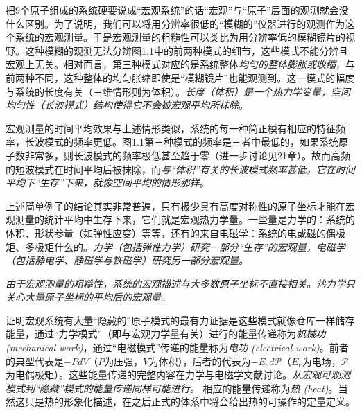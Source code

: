 把9个原子组成的系统硬要说成“宏观系统”的话“宏观”与“原子”层面的观测就会没什么区别。为了说明，我们可以将用分辨率很低的“模糊的”仪器进行的观测作为这个系统的宏观测量。于是宏观测量的粗糙性可以类比为用分辨率低的模糊镜片的视野。这种模糊的观测无法分辨图1.1中的前两种模式的细节，这些模式不能分辨且宏观上无关。相对而言，第三种模式对应的是系统整体{\it 均匀的整体膨胀或收缩}，与前两种不同，这种整体的均匀胀缩即使是“模糊镜片”也能观测到。这一模式的幅度与系统的长度有关（三维情形则为体积）。{\it 长度（体积）是一个热力学变量，空间均匀性（长波模式）结构使得它不会被宏观平均所抹除}。

宏观测量的时间平均效果与上述情形类似，系统的每一种简正模有相应的特征频率，长波模式的频率更低。图1.1第三种模式的频率是三者中最低的，如果系统原子数非常多，则长波模式的频率极低甚至趋于零（进一步讨论见21章）。故而高频的短波模式在时间平均后被抹除，而{\it 与“体积”有关的长波模式频率甚低，它在时间平均下“生存”下来，就像空间平均的情形那样}。

上述简单例子的结论其实非常普遍，只有极少具有高度对称性的原子坐标才能在宏观测量的统计平均中生存下来，它们就是宏观热力学量。一些量是力学的：系统的体积、形状参量（如弹性应变）等等，还有的来自电磁学：系统的电或磁的偶极矩、多极矩什么的。{\it 力学（包括弹性力学）研究一部分“生存”的宏观量，电磁学（包括静电学、静磁学与铁磁学）研究另一部分宏观量。}

{\it 由于宏观测量的粗糙性，系统的宏观描述与大多数原子坐标不直接相关。热力学只关心大量原子坐标的平均后的宏观量。} 

证明宏观系统有大量“隐藏的”原子模式的最有力证据是这些模式就像仓库一样储存能量，通过“力学模式”（即与宏观力学量有关）进行的能量传递称为{\it 机械功 (mechanical work)}，通过“电磁模式”传递的能量称为{\it 电功 (electrical work)}。前者的典型代表是$-P dV$（$P$为压强，$V$为体积），后者的代表为$-E_e d\mathscr{P}$（$E_e$为电场，$\mathscr{P}$为电偶极矩）。这些能量传递的完整内容在力学与电磁学文献讨论。{\it 从宏观可观测模式到“隐藏”模式的能量传递同样可能进行。} 相应的能量传递称为{\it 热 (heat)}。当然这只是热的形象化描述，在之后正式的体系中将会给出热的可操作的定量定义。

